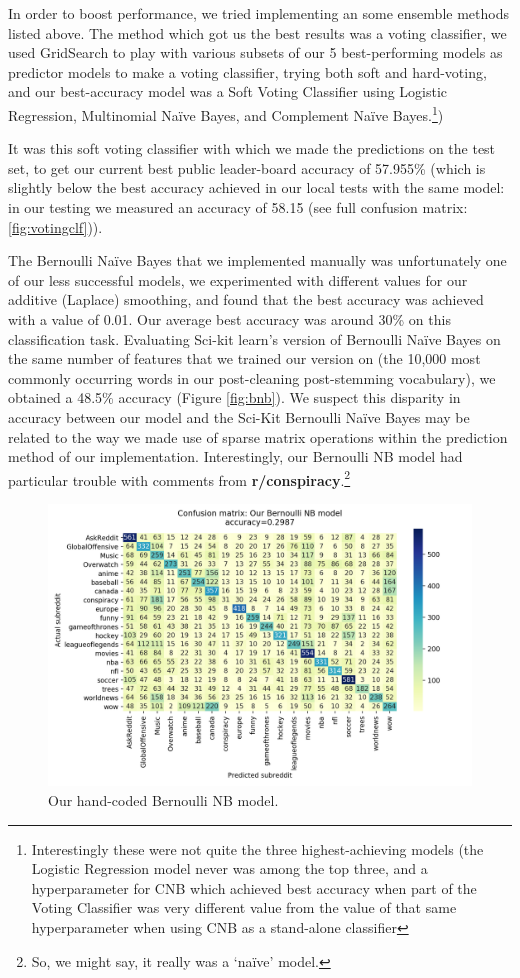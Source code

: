 \documentclass[letterpaper, 11pt]{article}
\begin{document}
In order to boost performance, we tried implementing an some ensemble methods listed above.  The method which got us the best results was a voting classifier, we used GridSearch to play with various subsets of our 5 best-performing models as predictor models to make a voting classifier, trying both soft and hard-voting, and our best-accuracy model was a Soft Voting Classifier using Logistic Regression, Multinomial Na\"ive Bayes, and Complement Na\"ive Bayes.\footnote{Interestingly these were not quite the three highest-achieving models (the Logistic Regression model never was among the top three, and a hyperparameter for CNB which achieved best accuracy when part of the Voting Classifier was very different value from the value of that same hyperparameter when using CNB as a stand-alone classifier})

It was this soft voting classifier with which we made the predictions on the test set, to get our current best public leader-board accuracy of 57.955\% (which is slightly below the best accuracy achieved in our local tests with the same model: in our testing we measured an accuracy of 58.15 (see full confusion matrix: \ref{fig:votingclf})). 


The Bernoulli Na\"ive Bayes that we implemented manually was unfortunately one of our less successful models, we experimented with different values for our additive (Laplace) smoothing, and found that the best accuracy was achieved with a value of 0.01.  Our average best accuracy was around 30\% on this classification task. Evaluating Sci-kit learn's version of Bernoulli Na\"ive Bayes on the same number of features that we trained our version on (the 10,000 most commonly occurring words in our post-cleaning post-stemming vocabulary), we obtained a 48.5\% accuracy (Figure \ref{fig:bnb}). We suspect this disparity in accuracy between our model and the Sci-Kit Bernoulli Na\"ive Bayes may be related to the way we made use of sparse matrix operations within the prediction method of our implementation. Interestingly, our Bernoulli NB model had particular trouble with comments from \textbf{r/conspiracy}.\footnote{So, we might say, it really was a `na\"ive' model.} 

\begin{figure}
    \centering
    \includegraphics[width=\textwidth/2]{images/ourbernoulli}
    \caption{Our hand-coded Bernoulli NB model.}
    \label{fig:ourbnb}
\end{figure}   
\end{document}
